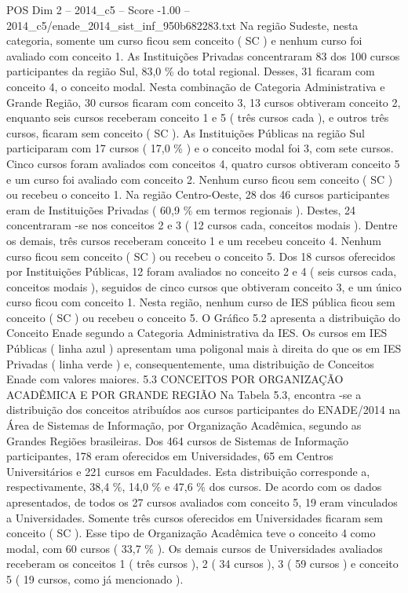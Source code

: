 \begin{textsample}{POS Dim 2 – 2014\_c5 – Score -1.00 – 2014\_c5/enade\_2014\_sist\_inf\_950b682283.txt}
Na região Sudeste, nesta categoria, somente um curso ficou sem conceito ( SC ) e nenhum curso foi avaliado com conceito 1.
As Instituições Privadas concentraram 83 dos 100 cursos participantes da região Sul, 83,0 \% do total regional.
Desses, 31 ficaram com conceito 4, o conceito modal.
Nesta combinação de Categoria Administrativa e Grande Região, 30 cursos ficaram com conceito 3, 13 cursos obtiveram conceito 2, enquanto seis cursos receberam conceito 1 e 5 ( três cursos cada ), e outros três cursos, ficaram sem conceito ( SC ).
As Instituições Públicas na região Sul participaram com 17 cursos ( 17,0 \% ) e o conceito modal foi 3, com sete cursos.
Cinco cursos foram avaliados com conceitos 4, quatro cursos obtiveram conceito 5 e um curso foi avaliado com conceito 2.
Nenhum curso ficou sem conceito ( SC ) ou recebeu o conceito 1.
Na região Centro-Oeste, 28 dos 46 cursos participantes eram de Instituições Privadas ( 60,9 \% em termos regionais ).
Destes, 24 concentraram -se nos conceitos 2 e 3 ( 12 cursos cada, conceitos modais ).
Dentre os demais, três cursos receberam conceito 1 e um recebeu conceito 4.
Nenhum curso ficou sem conceito ( SC ) ou recebeu o conceito 5.
Dos 18 cursos oferecidos por Instituições Públicas, 12 foram avaliados no conceito 2 e 4 ( seis cursos cada, conceitos modais ), seguidos de cinco cursos que obtiveram conceito 3, e um único curso ficou com conceito 1.
Nesta região, nenhum curso de IES pública ficou sem conceito ( SC ) ou recebeu o conceito 5.
O Gráfico 5.2 apresenta a distribuição do Conceito Enade segundo a Categoria Administrativa da IES.
Os cursos em IES Públicas ( linha azul ) apresentam uma poligonal mais à direita do que os em IES Privadas ( linha verde ) e, consequentemente, uma distribuição de Conceitos Enade com valores maiores. 5.3 CONCEITOS POR ORGANIZAÇÃO ACADÊMICA E POR GRANDE REGIÃO Na Tabela 5.3, encontra -se a distribuição dos conceitos atribuídos aos cursos participantes do ENADE/2014 na Área de Sistemas de Informação, por Organização Acadêmica, segundo as Grandes Regiões brasileiras.
Dos 464 cursos de Sistemas de Informação participantes, 178 eram oferecidos em Universidades, 65 em Centros Universitários e 221 cursos em Faculdades.
Esta distribuição corresponde a, respectivamente, 38,4 \%, 14,0 \% e 47,6 \% dos cursos.
De acordo com os dados apresentados, de todos os 27 cursos avaliados com conceito 5, 19 eram vinculados a Universidades.
Somente três cursos oferecidos em Universidades ficaram sem conceito ( SC ).
Esse tipo de Organização Acadêmica teve o conceito 4 como modal, com 60 cursos ( 33,7 \% ).
Os demais cursos de Universidades avaliados receberam os conceitos 1 ( três cursos ), 2 ( 34 cursos ), 3 ( 59 cursos ) e conceito 5 ( 19 cursos, como já mencionado ).

\end{textsample}
